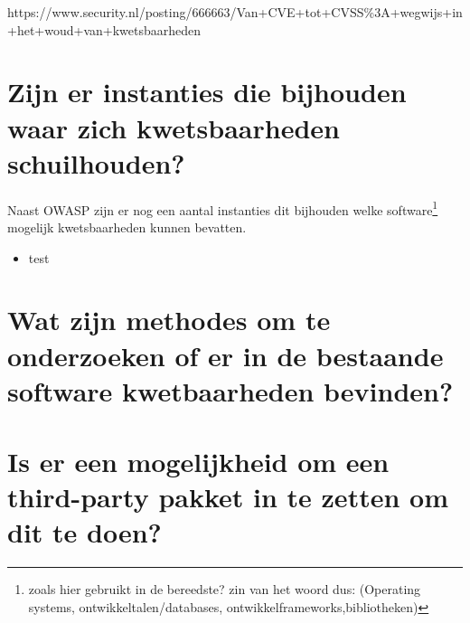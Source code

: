https://www.security.nl/posting/666663/Van+CVE+tot+CVSS\%3A+wegwijs+in+het+woud+van+kwetsbaarheden










\section{Zijn er instanties die bijhouden waar zich kwetsbaarheden schuilhouden?}

Naast OWASP zijn er nog een aantal instanties dit bijhouden welke software\footnote{zoals hier gebruikt in de bereedste? zin van het woord dus: (Operating systems, ontwikkeltalen/databases, ontwikkelframeworks,bibliotheken) }
mogelijk kwetsbaarheden kunnen bevatten.
\begin{itemize}
\item test
\end{itemize}


\section{Wat zijn methodes om te onderzoeken of er in de bestaande software kwetbaarheden bevinden?}

\section{Is er een mogelijkheid om een third-party pakket in te zetten om dit te doen?}
